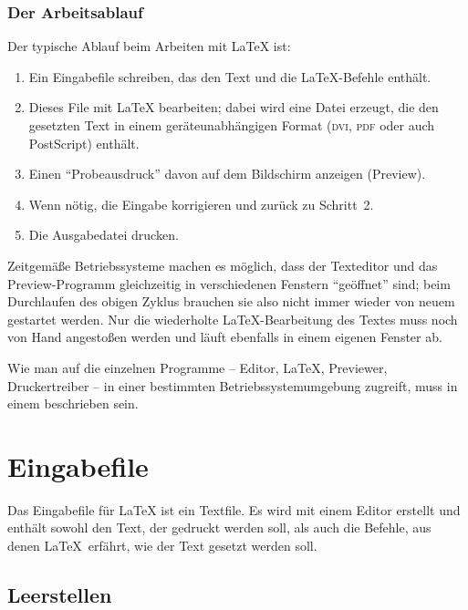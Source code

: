 \subsubsection{Der Arbeitsablauf}
Der typische Ablauf beim Arbeiten mit \LaTeX{} ist:
\begin{enumerate}
  \item Ein Eingabefile schreiben, das den Text und die \LaTeX-Befehle 
  enthält.
  \item Dieses File mit \LaTeX{} bearbeiten; dabei wird eine Datei
  erzeugt, die den gesetzten Text in einem geräteunabhängigen Format
  (\textsc{dvi}, \textsc{pdf} oder auch PostScript) enthält.
  \item Einen "`Probeausdruck"' davon auf dem Bildschirm anzeigen (Preview).
  \item Wenn nötig, die Eingabe korrigieren und zurück zu Schritt~2.
  \item Die Ausgabedatei drucken.
\end{enumerate}
Zeitgemäße Betriebssysteme machen es möglich, dass der Texteditor
und das Preview-Programm gleichzeitig in verschiedenen Fenstern 
"`geöffnet"' sind; beim Durchlaufen des obigen Zyklus brauchen sie 
also nicht immer wieder von neuem gestartet werden.  Nur die 
wiederholte \LaTeX-Bearbeitung des Textes muss noch von Hand 
angestoßen werden und läuft ebenfalls in einem eigenen Fenster ab.

Wie man auf die einzelnen Programme -- Editor, \LaTeX, Previewer,
Druckertreiber -- in einer bestimmten
Betriebssystemumgebung zugreift, muss in einem \local{}
beschrieben sein.



\section{Eingabefile}
Das Eingabefile für \LaTeX{} ist ein Textfile. Es wird mit einem
Editor erstellt und enthält sowohl den Text, der gedruckt
werden soll, als auch die Befehle, aus denen \LaTeX\ erfährt,
wie der Text gesetzt werden soll.


\subsection{Leerstellen}
 

